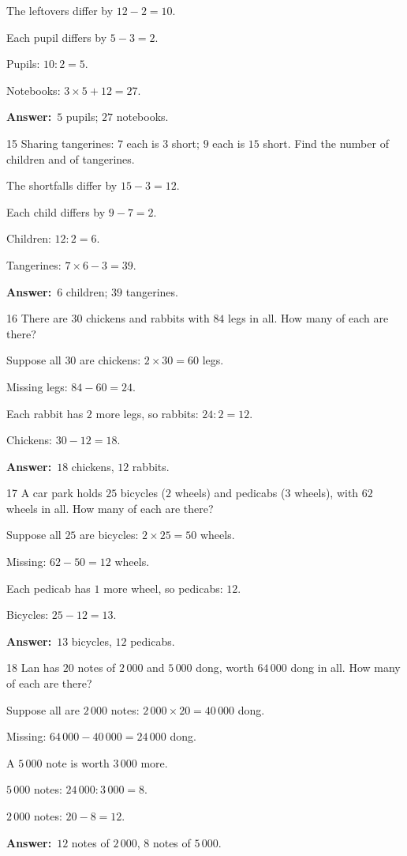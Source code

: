 \documentclass[11pt]{article}
\newif\ifsol \solfalse
\providecommand{\AnsWord}{Đáp số}
\newcommand{\dapso}[1]{\par\textbf{\AnsWord:}\ #1}
\newcommand{\probsol}[1]{%
  \begin{lrbox}{\solmeasure}\begin{minipage}{\dimexpr\linewidth-24pt\relax}#1\end{minipage}\end{lrbox}%
  \ifsol
    \begin{solbox}#1\end{solbox}%
  \else
    \setlength{\solht}{\dimexpr\ht\solmeasure+\dp\solmeasure+0.85cm\relax}%
    \ifdim\solht<1.35cm\setlength{\solht}{1.35cm}\fi
    \begin{tcolorbox}[colback=white,colframe=Line,boxrule=0.8pt,arc=5pt,
      left=8pt,right=8pt,top=4pt,bottom=4pt,height=\solht]{\footnotesize\color{Slate}\itshape\WorkWord}\end{tcolorbox}%
  \fi}
\newcommand{\gap}{\vspace{0.3cm}}
\def\WorkWord{Your work:}
\def\AnsWord{Answer}
\begin{document}
\probsol{
The leftovers differ by $12-2=10$.\par Each pupil differs by $5-3=2$.\par Pupils: $10:2=5$.\par Notebooks: $3\times5+12=27$.
\dapso{$5$ pupils; $27$ notebooks.}}
\gap
\begin{probbox}{15}{\relax}
Sharing tangerines: $7$ each is $3$ short; $9$ each is $15$ short. Find the number of children and of tangerines.
\end{probbox}
\probsol{
The shortfalls differ by $15-3=12$.\par Each child differs by $9-7=2$.\par Children: $12:2=6$.\par Tangerines: $7\times6-3=39$.
\dapso{$6$ children; $39$ tangerines.}}
\gap
\begin{probbox}{16}{\relax}
There are $30$ chickens and rabbits with $84$ legs in all. How many of each are there?
\end{probbox}
\probsol{
Suppose all $30$ are chickens: $2\times30=60$ legs.\par Missing legs: $84-60=24$.\par Each rabbit has $2$ more legs, so rabbits: $24:2=12$.\par Chickens: $30-12=18$.
\dapso{$18$ chickens, $12$ rabbits.}}
\gap
\begin{probbox}{17}{\relax}
A car park holds $25$ bicycles ($2$ wheels) and pedicabs ($3$ wheels), with $62$ wheels in all. How many of each are there?
\end{probbox}
\probsol{
Suppose all $25$ are bicycles: $2\times25=50$ wheels.\par Missing: $62-50=12$ wheels.\par Each pedicab has $1$ more wheel, so pedicabs: $12$.\par Bicycles: $25-12=13$.
\dapso{$13$ bicycles, $12$ pedicabs.}}
\gap
\begin{probbox}{18}{\relax}
Lan has $20$ notes of $2\,000$ and $5\,000$ dong, worth $64\,000$ dong in all. How many of each are there?
\end{probbox}
\probsol{
Suppose all are $2\,000$ notes: $2\,000\times20=40\,000$ dong.\par Missing: $64\,000-40\,000=24\,000$ dong.\par A $5\,000$ note is worth $3\,000$ more.\par $5\,000$ notes: $24\,000:3\,000=8$.\par $2\,000$ notes: $20-8=12$.
\dapso{$12$ notes of $2\,000$, $8$ notes of $5\,000$.}}
\end{document}
